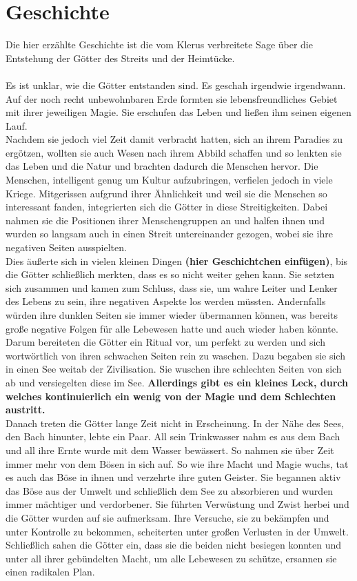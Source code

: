 \section{Geschichte}
Die hier erzählte Geschichte ist die vom Klerus verbreitete Sage über die Entstehung der Götter des Streits und der Heimtücke. \\\\
Es ist unklar, wie die Götter entstanden sind. Es geschah irgendwie irgendwann. Auf der noch recht unbewohnbaren Erde formten sie lebensfreundliches Gebiet mit ihrer jeweiligen Magie. Sie erschufen das Leben und ließen ihm seinen eigenen Lauf.\\
Nachdem sie jedoch viel Zeit damit verbracht hatten, sich an ihrem Paradies zu ergötzen, wollten sie auch Wesen nach ihrem Abbild schaffen und so lenkten sie das Leben und die Natur und brachten dadurch die Menschen hervor. Die Menschen, intelligent genug um Kultur aufzubringen, verfielen jedoch in viele Kriege. Mitgerissen aufgrund ihrer Ähnlichkeit und weil sie die Menschen so interessant fanden, integrierten sich die Götter in diese Streitigkeiten. Dabei nahmen sie die Positionen ihrer Menschengruppen an und halfen ihnen und wurden so langsam auch in einen Streit untereinander gezogen, wobei sie ihre negativen Seiten ausspielten.\\
Dies äußerte sich in vielen kleinen Dingen \textbf{(hier Geschichtchen einfügen)}, bis die Götter schließlich merkten, dass es so nicht weiter gehen kann. Sie setzten sich zusammen und kamen zum Schluss, dass sie, um wahre Leiter und Lenker des Lebens zu sein, ihre negativen Aspekte los werden müssten. Andernfalls würden ihre dunklen Seiten sie immer wieder übermannen können, was bereits große negative Folgen für alle Lebewesen hatte und auch wieder haben könnte.\\
Darum bereiteten die Götter ein Ritual vor, um perfekt zu werden und sich wortwörtlich von ihren schwachen Seiten rein zu waschen. Dazu begaben sie sich in einen See weitab der Zivilisation. Sie wuschen ihre schlechten Seiten von sich ab und versiegelten diese im See. \textbf{Allerdings gibt es ein kleines Leck, durch welches kontinuierlich ein wenig von der Magie und dem Schlechten austritt.}\\
Danach treten die Götter lange Zeit nicht in Erscheinung. In der Nähe des Sees, den Bach hinunter, lebte ein Paar. All sein Trinkwasser nahm es aus dem Bach und all ihre Ernte wurde mit dem Wasser bewässert. So nahmen sie über Zeit immer mehr von dem Bösen in sich auf. So wie ihre Macht und Magie wuchs, tat es auch das Böse in ihnen und verzehrte ihre guten Geister. Sie begannen aktiv das Böse aus der Umwelt und schließlich dem See zu absorbieren und wurden immer mächtiger und verdorbener. Sie führten Verwüstung und Zwist herbei und die Götter wurden auf sie aufmerksam. Ihre Versuche, sie zu bekämpfen und unter Kontrolle zu bekommen, scheiterten unter großen Verlusten in der Umwelt. Schließlich sahen die Götter ein, dass sie die beiden nicht besiegen konnten und unter all ihrer gebündelten Macht, um alle Lebewesen zu schütze, ersannen sie einen radikalen Plan.\\
